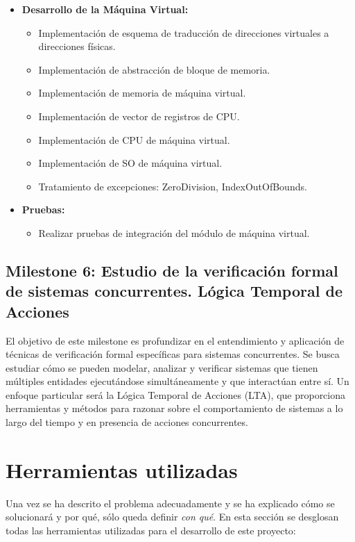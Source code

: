 \begin{itemize}
    \item \textbf{Desarrollo de la Máquina Virtual:}
    \begin{itemize}
        \item Implementación de esquema de traducción de direcciones virtuales a direcciones físicas.
        \item Implementación de abstracción de bloque de memoria.
        \item Implementación de memoria de máquina virtual.
        \item Implementación de vector de registros de CPU.
        \item Implementación de CPU de máquina virtual.
        \item Implementación de SO de máquina virtual.
        \item Tratamiento de excepciones: ZeroDivision, IndexOutOfBounds.
    \end{itemize}
    \item \textbf{Pruebas:}
    \begin{itemize}
        \item Realizar pruebas de integración del módulo de máquina virtual.
    \end{itemize}
\end{itemize}

\subsection{Milestone 6: Estudio de la verificación formal de sistemas concurrentes. Lógica Temporal de Acciones}
El objetivo de este milestone es profundizar en el entendimiento y aplicación de técnicas de verificación formal específicas para sistemas concurrentes. Se busca estudiar cómo se pueden modelar, analizar y verificar sistemas que tienen múltiples entidades ejecutándose simultáneamente y que interactúan entre sí. Un enfoque particular será la Lógica Temporal de Acciones (LTA), que proporciona herramientas y métodos para razonar sobre el comportamiento de sistemas a lo largo del tiempo y en presencia de acciones concurrentes.

\section{Herramientas utilizadas}
Una vez se ha descrito el problema adecuadamente y se ha explicado cómo se solucionará y por qué, sólo queda definir \textit{con qué}. En esta sección se desglosan todas las herramientas utilizadas para el desarrollo de este proyecto:


